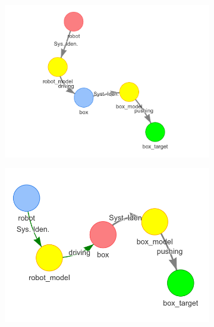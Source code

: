 \begin{figure}[H]
    \begin{subfigure}{.3\textwidth}
    \centering
    \includegraphics[width=1\textwidth]{figures/connecting_nodes/robot_push/robot_push_4}
    \caption{}\label{subfig:robot_push_4}
    \end{subfigure}
    \begin{subfigure}{.3\textwidth}
    \centering
    \includegraphics[width=1.05\textwidth]{figures/connecting_nodes/robot_push/robot_push_5}
    \caption{}\label{subfig:robot_push_5}
    \end{subfigure}
    \begin{subfigure}{.3\textwidth}
    \centering

\end{subfigure}
\end{figure}
